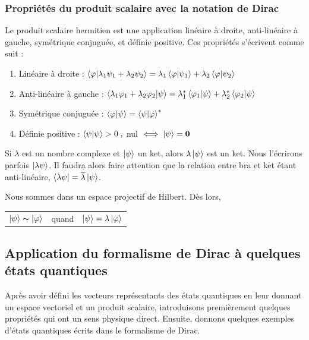 \documentclass[../notesdecours.tex]{subfiles}
\begin{document}
\subsubsection{Propriétés du produit scalaire avec la notation de Dirac}
Le produit scalaire hermitien est une application linéaire à droite, anti-linéaire à gauche, symétrique conjuguée, et définie positive. Ces propriétés s'écrivent comme suit :
\begin{enumerate}[label = \roman*)]
	\item Linéaire à droite : $\braket{\varphi |\lambda_1 \psi_1 + \lambda_2 \psi_2} = \lambda_1\braket{\varphi | \psi_1} + \lambda_2 \braket{\varphi | \psi_2}$
	\item Anti-linéaire à gauche : $\braket{\lambda_1 \varphi_1 + \lambda_2 \varphi_2 | \psi } = \lambda^* _1\braket{\varphi_1 | \psi} +\lambda_2^* \braket{\varphi_2 | \psi}$
	\item Symétrique conjuguée : $\braket{\varphi | \psi} = \braket{\psi | \varphi} ^*$
	\item Définie positive : $\braket{\psi | \psi} >0 \; , $ nul $\iff \ket\psi = \bm{0}$
\end{enumerate}


\begin{remark}\label{remark:correspondance antilinéaire} Si $\lambda$ est un nombre complexe et $\ket{\psi}$ un ket, alors $\lambda\ket{\psi}$ est un ket. Nous l'écrirons parfois $\ket{\lambda\psi}$. Il faudra alors faire attention que la relation entre bra et ket étant anti-linéaire, $\bra{\lambda\psi} = \overline{\lambda}\ket{\psi}$. \end{remark}
\begin{remark}
	Nous sommes dans un espace projectif de Hilbert. Dès lors,
	\begin{center}
	\begin{tabular}{ c c c } 
	$\ket{\psi} \thicksim \ket{\varphi}$ & quand & $\ket{\psi} = \lambda\ket{\varphi}$  
	\end{tabular}
	\end{center}
\end{remark}

\subsection{Application du formalisme de Dirac à quelques états quantiques}
Après avoir défini les vecteurs représentants des états quantiques en leur donnant un espace vectoriel et un produit scalaire, introduisons premièrement quelques propriétés qui ont un sens physique direct. Ensuite, donnons quelques exemples d'états quantiques écrits dans le formalisme de Dirac.
\end{document}
